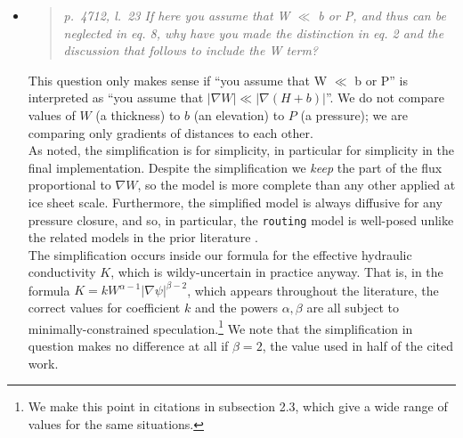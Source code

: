 \documentclass[11pt,reqno]{amsart}
\newcommand{\grad}{\nabla}
\newcommand{\reply}[2]{
\medskip\medskip
\item  \begin{quote}
\emph{#1}
\end{quote}

\medskip
\noindent #2}
\begin{document}
\begin{itemize}
\reply{p.~4712, l.~23 If here you assume that W $\ll$ b or P, and thus can be neglected in eq. 8, why have you made the distinction in eq. 2 and the discussion that follows to include the W term?}
{This question only makes sense if ``you assume that W $\ll$ b or P'' is interpreted as ``you assume that $|\nabla W| \ll |\nabla (H+b)|$''.  We do not compare values of $W$ (a thickness) to $b$ (an elevation) to $P$ (a pressure); we are comparing only gradients of distances to each other.\\
\indent As noted, the simplification is for simplicity, in particular for simplicity in the final implementation.  Despite the simplification we \emph{keep} the part of the flux proportional to $\grad W$, so the model is more complete than any other applied at ice sheet scale.  Furthermore, the simplified model is always diffusive for any pressure closure, and so, in particular, the \texttt{routing} model is well-posed unlike the related models in the prior literature \cite{LeBrocqetal2009,Siegertetal2009}. \\
\indent The simplification occurs inside our formula for the effective hydraulic conductivity $K$, which is wildy-uncertain in practice anyway.  That is, in the formula $K = k W^{\alpha-1} |\grad \psi|^{\beta-2}$, which appears throughout the literature, the correct values for coefficient $k$ and the powers $\alpha,\beta$ are all subject to minimally-constrained speculation.\footnote{We make this point in citations in subsection 2.3, which give a wide range of values for the same situations.}  We note that the simplification in question makes no difference at all if $\beta=2$, the value used in half of the cited work.}


\end{itemize}
\end{document}
